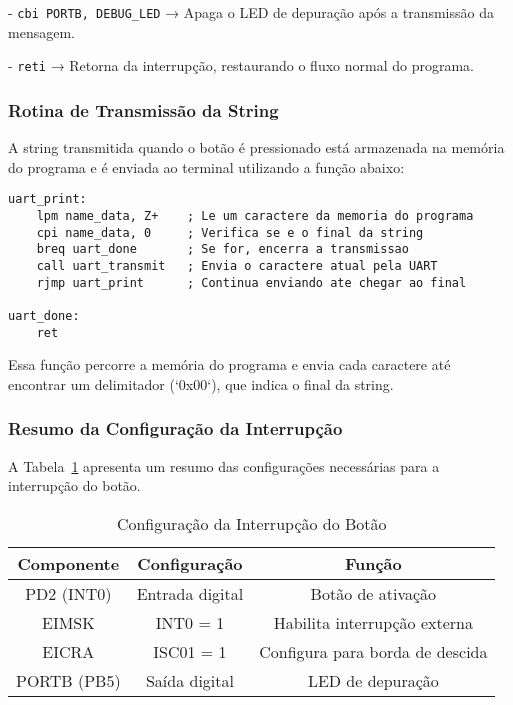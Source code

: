 \documentclass{sbrt}
\begin{document}
- \texttt{cbi PORTB, DEBUG\_LED} → Apaga o LED de depuração após a transmissão da mensagem.

- \texttt{reti} → Retorna da interrupção, restaurando o fluxo normal do programa.

\subsubsection{Rotina de Transmissão da String}

A string transmitida quando o botão é pressionado está armazenada na memória do programa e é enviada ao terminal utilizando a função abaixo:

\begin{lstlisting}[style=assemblyStyle, caption={Rotina para envio de string via UART}, label={lst:uart_print}]
uart_print:
    lpm name_data, Z+    ; Le um caractere da memoria do programa
    cpi name_data, 0     ; Verifica se e o final da string
    breq uart_done       ; Se for, encerra a transmissao
    call uart_transmit   ; Envia o caractere atual pela UART
    rjmp uart_print      ; Continua enviando ate chegar ao final

uart_done:
    ret
\end{lstlisting}

Essa função percorre a memória do programa e envia cada caractere até encontrar um delimitador (`0x00`), que indica o final da string.

\subsubsection{Resumo da Configuração da Interrupção}

A Tabela~\ref{tab:int} apresenta um resumo das configurações necessárias para a interrupção do botão.

\begin{table}[h]
\centering
\caption{Configuração da Interrupção do Botão}
\label{tab:int}
\begin{tabular}{|c|c|c|}
\hline
\textbf{Componente} & \textbf{Configuração} & \textbf{Função} \\
\hline
PD2 (INT0) & Entrada digital & Botão de ativação \\
EIMSK & INT0 = 1 & Habilita interrupção externa \\
EICRA & ISC01 = 1 & Configura para borda de descida \\
PORTB (PB5) & Saída digital & LED de depuração \\
\hline
\end{tabular}
\end{table}
\end{document}

